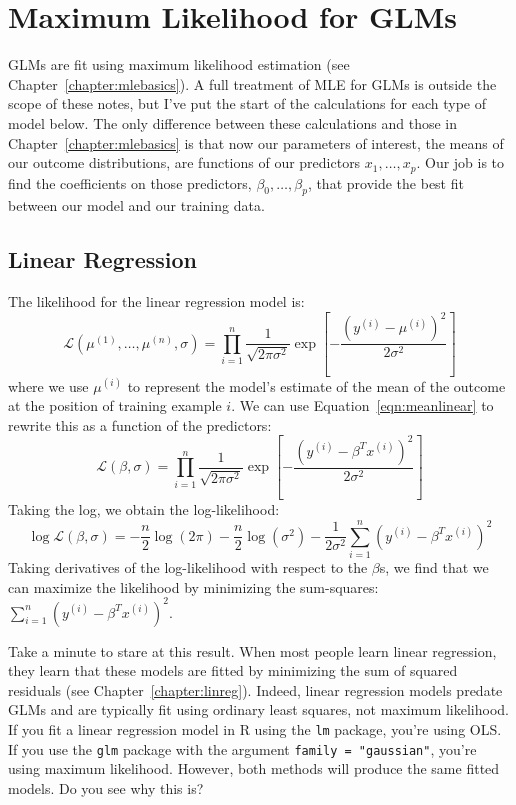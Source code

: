 
\section{Maximum Likelihood for GLMs}

GLMs are fit using maximum likelihood estimation (see Chapter~\ref{chapter:mlebasics}). A full treatment of MLE for GLMs is outside the scope of these notes, but I've put the start of the calculations for each type of model below. The only difference between these calculations and those in Chapter~\ref{chapter:mlebasics} is that now our parameters of interest, the means of our outcome distributions, are functions of our predictors $x_1, \dots, x_p$. Our job is to find the coefficients on those predictors, $\beta_0, \dots, \beta_p$, that provide the best fit between our model and our training data.

\subsection{Linear Regression} 

The likelihood for the linear regression model is:
$$ \mathcal{L}(\mu^{(1)}, \dots, \mu^{(n)}, \sigma) = \prod_{i=1}^n \frac{1}{\sqrt{2 \pi \sigma^2}} \exp \left[ - \frac{(y^{(i)} - \mu^{(i)})^2}{2 \sigma^2} \right] $$
where we use $\mu^{(i)}$ to represent the model's estimate of the mean of the outcome at the position of training example $i$. We can use Equation~\ref{eqn:meanlinear} to rewrite this as a function of the predictors:
$$ \mathcal{L}(\beta, \sigma) = \prod_{i=1}^n \frac{1}{\sqrt{2 \pi \sigma^2}} \exp \left[ - \frac{(y^{(i)} - \beta^T x^{(i)})^2}{2 \sigma^2} \right] $$
Taking the log, we obtain the log-likelihood:
$$ \log \mathcal{L}(\beta, \sigma) = -\frac{n}{2} \log (2 \pi) - \frac{n}{2} \log(\sigma^2) - \frac{1}{2 \sigma^2} \sum_{i=1}^n \left( y^{(i)} - \beta^T x^{(i)} \right)^2 $$
Taking derivatives of the log-likelihood with respect to the $\beta$s, we find that we can maximize the likelihood by minimizing the sum-squares: $\sum_{i=1}^n \left( y^{(i)} - \beta^T x^{(i)} \right)^2$.

\vspace{3mm}

\begin{question}{}
Take a minute to stare at this result. When most people learn linear regression, they learn that these models are fitted by minimizing the sum of squared residuals (see Chapter~\ref{chapter:linreg}). Indeed, linear regression models predate GLMs and are typically fit using ordinary least squares, not maximum likelihood. If you fit a linear regression model in R using the \texttt{lm} package, you're using OLS. If you use the \texttt{glm} package with the argument \texttt{family = "gaussian"}, you're using maximum likelihood. However, both methods will produce the same fitted models. Do you see why this is?
\end{question}

